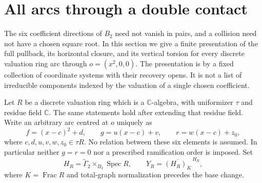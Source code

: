 \documentclass[11pt,reqno]{amsart}
\numberwithin{equation}{section}
\theoremstyle{definition}\newtheorem{definition}[theorem]{Definition}
\theoremstyle{remark}\newtheorem{remark}[theorem]{Remark}
\newcommand{\C}{\mathbb C}\newcommand{\Q}{\mathbb Q}
\begin{document}
\section{All arcs through a double contact}
\label{sec:all-arcs-v166}
The six coefficient directions of $B_2$ need not vanish in pairs,
and a collision need not have a chosen square root. In this section
we give a finite presentation of the full pullback, its horizontal
closure, and its vertical torsion for every discrete valuation ring
arc through $o=(x^2,0,0)$. The presentation is by a fixed collection
of coordinate systems with their recovery opens. It is not a list
of irreducible components indexed by the valuation of a single
chosen coefficient.

Let $R$ be a discrete valuation ring which is a $\C$-algebra, with
uniformizer $\tau$ and residue field $\C$. The same statements hold
after extending that residue field. Write an arbitrary arc centred
at $o$ uniquely as
\begin{equation}\label{eq:all-arc-coefficients-v166}
 f=(x-c)^2+d,\qquad g=u(x-c)+v,\qquad
 r=w(x-c)+z_0,
\end{equation}
where $c,d,u,v,w,z_0\in\tau R$. No relation between these six
elements is assumed. In particular neither $g=r=0$ nor a prescribed
ramification order is imposed. Set
\[
 H_R=\widetilde\Gamma_2\times_{B_2}\operatorname{Spec}R,
 \qquad Y_R=\overline{(H_R)_K}^{\,H_R},
\]
where $K=\operatorname{Frac}R$ and total-graph normalization precedes
the base change.
\end{document}
